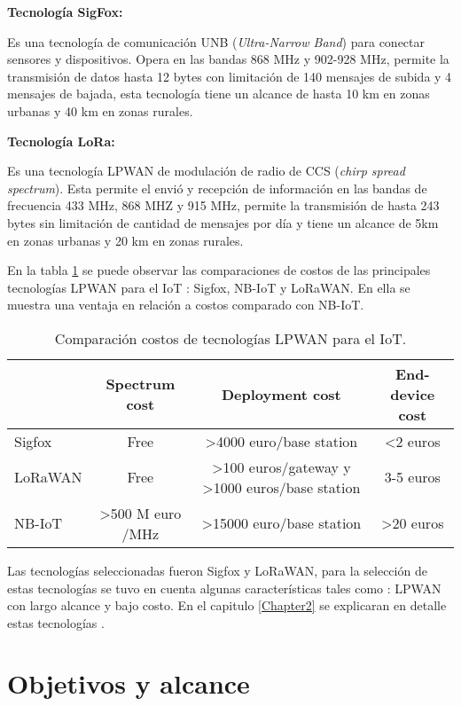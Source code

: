 \textbf{Tecnología SigFox:} 

Es una tecnología de comunicación UNB (\textit{Ultra-Narrow Band}) para conectar sensores y dispositivos. Opera en las bandas 868 MHz y 902-928 MHz, permite la transmisión de datos hasta 12 bytes con limitación de 140 mensajes de subida y 4 mensajes de bajada, esta tecnología tiene un alcance de hasta 10 km en zonas urbanas y 40 km en zonas rurales\cite{MEKKI20191}.

\textbf{Tecnología LoRa:} 

Es una tecnología LPWAN de modulación de radio de CCS (\textit{chirp spread spectrum}). Esta permite el envió y recepción de información en las bandas de frecuencia 433 MHz, 868 MHZ y 915 MHz, permite la transmisión de hasta 243 bytes sin limitación de cantidad de mensajes por día y tiene un alcance de 5km en zonas urbanas y 20 km en zonas rurales\cite{MEKKI20191}.

En la tabla \ref{tab:Comparacion1Tabla} se puede observar las comparaciones de costos de las principales tecnologías LPWAN para el IoT : Sigfox, NB-IoT y LoRaWAN. En ella se muestra una ventaja en relación a costos comparado con NB-IoT\cite{mekki2018overview}.

\begin{table}[h]
    \small
	\centering
	\caption[Comparación costos.]{Comparación costos de tecnologías LPWAN para el IoT.}
	\begin{tabular}{l c c c}    
		\toprule
		\textbf{ } 	   & \textbf{Spectrum cost} & \textbf{Deployment cost} 	& \textbf{End-device cost}\\
		\midrule
		Sigfox 	    &Free &>4000 euro/base station &<2 euros\\	
 		LoRaWAN 	&Free  &>100 euros/gateway y >1000 euros/base station &3-5 euros\\
        NB-IoT      &>500 M euro /MHz &>15000 euro/base station &>20 euros\\
		\bottomrule
		\hline
	\end{tabular}
	\label{tab:Comparacion1Tabla}
\end{table}

Las tecnologías seleccionadas fueron Sigfox y LoRaWAN, para la selección de estas tecnologías se tuvo en cuenta algunas características tales como : LPWAN con largo alcance\cite{Samie:2016:ITE:2968456.2974004} y bajo costo\cite{mekki2018overview}. En el capitulo \ref{Chapter2} se explicaran en detalle estas tecnologías .


\section{Objetivos y alcance}

